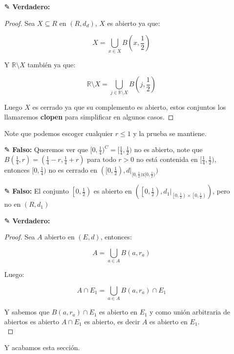 \begin{itemize}
\begin{proof}
\end{proof}


\item[✎]\textbf{Verdadero: } \\
\begin{proof}
    Sea $X\subseteq R$ en $(R,d_d)$, $X$ es abierto ya que:

    $$X=\bigcup_{x \in X}B\left(x,\frac{1}{2}\right)$$

    Y $\mathbb{R}\setminus X$ también ya que:

     $$\mathbb{R}\setminus X=\bigcup_{j \in \mathbb{R}\setminus X}B\left(j,\frac{1}{2}\right)$$

     Luego $X$ es cerrado ya que su complemento es abierto, estos conjuntos los llamaremos \textbf{clopen} para simplificar en algunos casos.
\end{proof}

Note que podemos escoger cualquier $r\leq 1$ y la prueba se mantiene.

\item[✎] \textbf{Falso: }Queremos ver que $[0,\frac{1}{4})^C=[\frac{1}{4},\frac{1}{2})$ no es abierto, note que $B(\frac{1}{4},r)=(\frac{1}{4}-r,\frac{1}{4}+r)$ para todo $r>0$ no está contenida en $[\frac{1}{4},\frac{1}{2})$, entonces $[0,\frac{1}{4})$ no es cerrado en $([0,\frac{1}{2}),d|_{[0,\frac{1}{2})\text{x}[0,\frac{1}{2})})$ 

\item[✎] \textbf{Falso: }El conjunto $\left[0, \frac{1}{2}\right)$ es abierto en $\left(\left[0, \frac{1}{2}\right),\left.d_1\right|_{\left[0, \frac{1}{2}\right) \times\left[0, \frac{1}{2}\right)}\right)$, pero no en $(R,d_1)$

\item[✎]\textbf{Verdadero: }\\
\begin{proof}
    Sea $A$ abierto en $(E,d)$, entonces:

    $$A=\bigcup_{a\in A} B(a,r_a)$$

    Luego:

    $$A\cap E_1=\bigcup_{a\in A} B(a,r_a)\cap E_1$$

Y sabemos que $B(a,r_a)\cap E_1$ es abierto en $E_1$ y como unión arbitraria de abiertos es abierto $A\cap E_1$ es abierto, es decir $A$ es abierto en $E_1$.\\
\end{proof}

Y acabamos esta sección.
\end{itemize}

